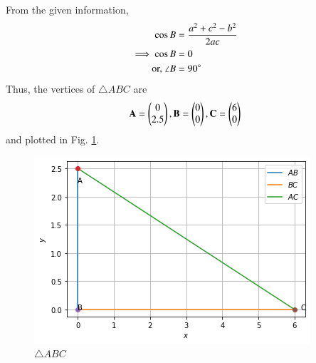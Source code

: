 From the given information, 
\begin{align}
\cos B &=\frac{a^2+c^2-b^2}{2ac}
\\
\implies \cos B&=0
\\
\text{or, } \angle B&=90\degree
\end{align}
%
Thus, the vertices of $\triangle ABC$ are 
\begin{align}
\mathbf{A} = \begin{pmatrix}0\\2.5\end{pmatrix}, \mathbf{B} = \begin{pmatrix}0\\0\end{pmatrix}, \mathbf{C} = \begin{pmatrix}6\\0\end{pmatrix}
\end{align}
and plotted in Fig. \ref{triangle/13/fig:triangle ABC}.
%
\begin{figure}[ht]
    \centering
    \includegraphics[width=\columnwidth]{solutions/triangle/13/download.png}
    \caption{ $\triangle ABC$}
    \label{triangle/13/fig:triangle ABC}
\end{figure}

